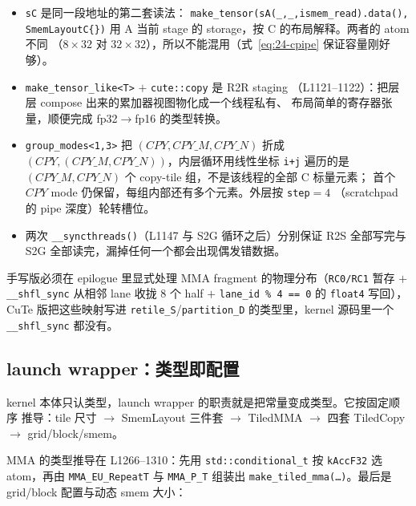 \begin{itemize}
  \item \texttt{sC} 是同一段地址的第二套读法：
        \texttt{make\_\allowbreak{}tensor\allowbreak{}(s\allowbreak{}A\allowbreak{}(\_\allowbreak{},\allowbreak{}\_\allowbreak{},\allowbreak{}ismem\_\allowbreak{}read).\allowbreak{}data\allowbreak{}(),\allowbreak{} Smem\allowbreak{}Layout\allowbreak{}C\{\})}
        用 A 当前 stage 的 storage，按 C 的布局解释。两者的 atom 不同
        （$8\times32$ 对 $32\times32$），所以不能混用（式~\eqref{eq:24-cpipe}
        保证容量刚好够）。
  \item \texttt{make\_\allowbreak{}tensor\_\allowbreak{}like\allowbreak{}<T>} $+$ \texttt{cute::copy} 是 R2R staging
        （L1121--1122）：把层层 compose 出来的累加器视图物化成一个线程私有、
        布局简单的寄存器张量，顺便完成 fp32$\to$fp16 的类型转换。
  \item \texttt{group\_\allowbreak{}modes\allowbreak{}<1,\allowbreak{}3>} 把 $(CPY, CPY\_M, CPY\_N)$ 折成
        $(CPY, (CPY\_M, CPY\_N))$，内层循环用线性坐标 \texttt{i+j} 遍历的是
        $(CPY\_M,CPY\_N)$ 个 copy-tile 组，不是该线程的全部 C 标量元素；
        首个 $CPY$ mode 仍保留，每组内部还有多个元素。外层按 \texttt{step}$=4$
        （scratchpad 的 pipe 深度）轮转槽位。
  \item 两次 \texttt{\_\allowbreak{}\_\allowbreak{}syncthreads\allowbreak{}()}（L1147 与 S2G 循环之后）分别保证
        R2S 全部写完与 S2G 全部读完，漏掉任何一个都会出现偶发错数据。
\end{itemize}

手写版必须在 epilogue 里显式处理 MMA fragment 的物理分布（\texttt{RC0/RC1} 暂存
$+$ \texttt{\_\_shfl\_sync} 从相邻 lane 收拢 8 个 half $+$
\texttt{lane\_id \% 4 == 0} 的 \texttt{float4} 写回），CuTe 版把这些映射写进
\texttt{retile\_S}/\texttt{partition\_D} 的类型里，kernel 源码里一个
\texttt{\_\_shfl\_sync} 都没有。

\subsection{launch wrapper：类型即配置}

kernel 本体只认类型，launch wrapper 的职责就是把常量变成类型。它按固定顺序
推导：tile 尺寸 $\to$ SmemLayout 三件套 $\to$ TiledMMA $\to$ 四套
TiledCopy $\to$ grid/block/smem。



MMA 的类型推导在 L1266--1310：先用 \texttt{std::\allowbreak{}conditional\_\allowbreak{}t} 按
\texttt{kAccF32} 选 atom，再由 \texttt{MMA\_\allowbreak{}EU\_\allowbreak{}Repeat\allowbreak{}T} 与
\texttt{MMA\_P\_T} 组装出 \texttt{make\_\allowbreak{}tiled\_\allowbreak{}mma\allowbreak{}(\dots)}。最后是
grid/block 配置与动态 smem 大小：

